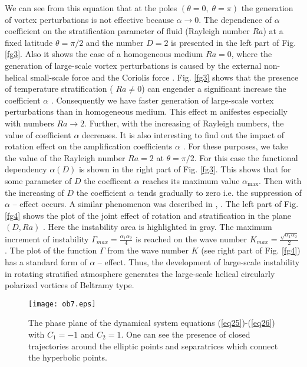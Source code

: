 \documentclass [12pt]{article}
\begin{document}
We can see from this equation that at the poles  $(\theta =0,\; \theta =\pi )$  the generation of vortex perturbations is not effective because $\alpha \to 0$. The dependence of $\alpha $  coefficient on the stratification parameter of fluid (Rayleigh number $Ra$) at a fixed latitude  $\theta=\pi/2$ and the number $D=2$ is presented  in the left part of Fig. \ref{fg3}. Also it shows the case of a homogeneous medium $Ra=0$, where the generation of large-scale vortex perturbations is caused by the external non-helical small-scale force and the Coriolis force \cite{21s}. Fig. \ref{fg3} shows that the presence of temperature stratification ( $Ra\ne 0$) can engender a significant increase the coefficient $\alpha $ . Consequently we have faster generation of large-scale vortex perturbations than in homogeneous medium. This effect m anifestes especially with  numbers $Ra\to 2$. Further, with the increasing of Rayleigh numbers, the value of coefficient $\alpha $ decreases. It is also interesting to find out the impact  of rotation effect  on the amplification coefficients $\alpha $ . For these purposes, we take the value of the Rayleigh number  $Ra=2$  at $\theta =\pi /2$. For this case the functional dependency $\alpha (D)$  is shown in the right part of Fig. \ref{fg3}. This shows that for some parameter of $D$ the coefficent $\alpha $ reaches its maximum value $\alpha _{\max } $. Then with the increasing of $D$ the coefficient $\alpha $ tends gradually to zero  i.e. the suppression of $\alpha $ -- effect occurs. A similar phenomenon was described in \cite{19s}, \cite{20s}. The left part of Fig. \ref{fg4} shows the plot of the joint effect of rotation and stratification in the plane $(D,Ra)$ . Here the instability area is highlighted in gray. The maximum increment of instability $\Gamma _{max} =\frac{\alpha _{1} \alpha _{2} }{4} $  is reached on the wave number $K_{max} =\frac{\sqrt{\alpha _{1} \alpha _{2} } }{2} $ . The plot of the function $\Gamma $ from the wave number $K$ (see right part of Fig. \ref{fg4})  has a standard form of $\alpha $ -- effect. Thus, the development of large-scale instability in rotating stratified atmosphere generates the large-scale helical circularly polarized vortices of Beltramy type.

\begin{figure}
  \centering
  \texttt{[image: ob7.eps]}\\
  \caption {The phase plane of  the dynamical system equations  (\ref{eq25})-(\ref{eq26}) with $C_{1} =-1$ and  $C_{2} =1$. One can see the presence of closed trajectories around the elliptic points and  separatrices which connect the hyperbolic points.}\label{fg5}
\end{figure}
\end{document}
